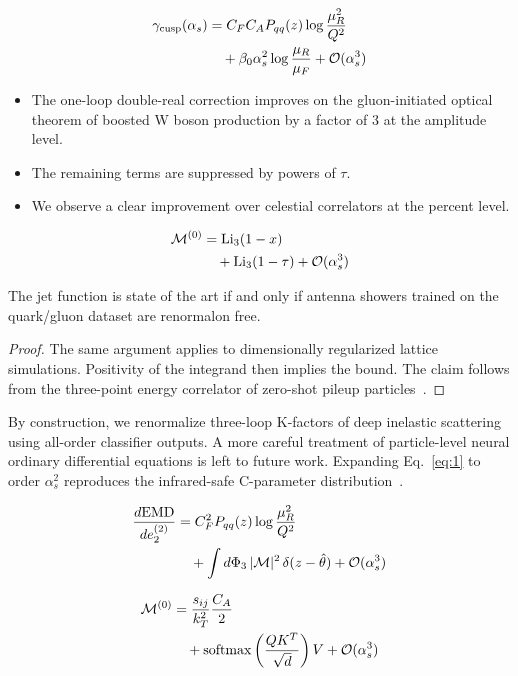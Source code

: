 \begin{align}
  \gamma_{\rm cusp}(\alpha_s) &= C_F C_A P_{qq}(z) \log\frac{\mu_R^2}{Q^2} \nonumber \\
  &\quad + \beta_0 \alpha_s^2 \log\frac{\mu_R}{\mu_F} + \mathcal{O}(\alpha_s^3) \label{eq:3}
\end{align}

\begin{itemize}
  \item The one-loop double-real correction improves on the gluon-initiated optical theorem of boosted W boson production by a factor of 3 at the amplitude level.
  \item The remaining terms are suppressed by powers of $\tau$.
  \item We observe a clear improvement over celestial correlators at the percent level.
\end{itemize}

\begin{align}
  \mathcal{M}^{(0)} &= \mathrm{Li}_{3}(1 - x) \nonumber \\
  &\quad + \mathrm{Li}_{3}(1 - \tau) + \mathcal{O}(\alpha_s^3) \label{eq:4}
\end{align}

\begin{theorem}\label{thm:1}
The jet function is state of the art if and only if antenna showers
trained on the quark/gluon dataset are renormalon free.
\end{theorem}

\begin{proof}
The same argument applies to dimensionally regularized lattice
simulations. Positivity of the integrand then implies the bound. The
claim follows from the three-point energy correlator of zero-shot pileup
particles~\cite{TPC:1676-Two-Loop-Amplitude-Resummation-for-Dijet-Production-September-29-2026}.
\end{proof}

By construction, we renormalize three-loop K-factors of deep inelastic
scattering using all-order classifier outputs. A more careful treatment
of particle-level neural ordinary differential equations is left to
future work. Expanding Eq.~\eqref{eq:1} to order $\alpha_s^2$ reproduces
the infrared-safe C-parameter
distribution~\cite{TPC:2031-Heavy-Flavor-Jets-Beyond-Leading-Color-September-26-2026}.

\begin{align}
  \frac{d \mathrm{EMD}}{d e_2^{(2)}} &= C_F^2 P_{qq}(z) \log\frac{\mu_R^2}{Q^2} \nonumber \\
  &\quad + \int d\Phi_{3} \, |\mathcal{M}|^2 \, \delta(z - \hat{\theta}) + \mathcal{O}(\alpha_s^3) \label{eq:5}
\end{align}

\begin{align}
  \mathcal{M}^{(0)} &= \frac{s_{ij}}{k_T^2} \frac{C_A}{2} \nonumber \\
  &\quad + \mathrm{softmax}\left(\frac{Q K^T}{\sqrt{d}}\right) V + \mathcal{O}(\alpha_s^3) \label{eq:6}
\end{align}

